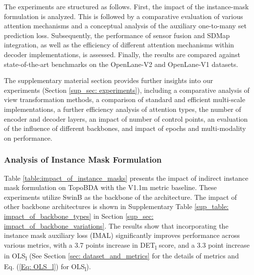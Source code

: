 The experiments are structured as follows. First, the impact of the instance-mask formulation is analyzed. This is followed by a comparative evaluation of various attention mechanisms and a conceptual analysis of the auxiliary one-to-many set prediction loss. Subsequently, the performance of sensor fusion and SDMap integration, as well as the efficiency of different attention mechanisms within decoder implementations, is assessed. Finally, the results are compared against state-of-the-art benchmarks on the OpenLane-V2 and OpenLane-V1 datasets.

The supplementary material section provides further insights into our experiments (Section \ref{sup_sec: experiments}), including a comparative analysis of view transformation methods, a comparison of standard and efficient multi-scale implementations, a further efficiency analysis of attention types, the number of encoder and decoder layers, an impact of number of control points, an evaluation of the influence of different backbones, and impact of epochs and multi-modality on performance.

\subsubsection{Analysis of Instance Mask Formulation}
\label{sec: exp_instance_mask_formulation}

\begin{table}[t]
\centering
\caption{Impact of indirect instance mask formulation on TopoBDA in Subset-A of OpenLane-V2 Metric with V1.1m Baseline. IMAL refers to the Instance Mask Auxiliary Loss and ML1M refers to the Mask-L1 Mix Matcher.}
\label{table:impact_of_instance_masks}
\end{table}

Table \ref{table:impact_of_instance_masks} presents the impact of indirect instance mask formulation on TopoBDA with the V1.1m metric baseline. These experiments utilize SwinB as the backbone of the architecture. The impact of other backbone architectures is shown in Supplementary Table \ref{sup_table: impact_of_backbone_types} in Section \ref{sup_sec: impact_of_backbone_variations}. The results show that incorporating the instance mask auxiliary loss (IMAL) significantly improves performance across various metrics, with a 3.7 points increase in DET\textsubscript{l} score, and a 3.3 point increase in OLS\textsubscript{l} (See Section \ref{sec: dataset_and_metrics} for the details of metrics and Eq. (\ref{Eq: OLS_l}) for OLS\textsubscript{l}).

